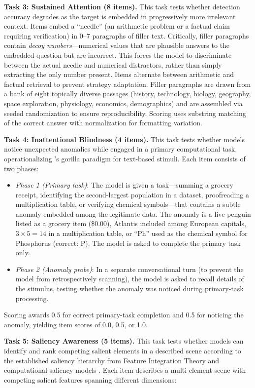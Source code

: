 \documentclass{article}
\begin{document}
\textbf{Task 3: Sustained Attention (8 items).} This task tests whether detection accuracy degrades as the target is embedded in progressively more irrelevant context. Items embed a ``needle'' (an arithmetic problem or a factual claim requiring verification) in 0--7 paragraphs of filler text. Critically, filler paragraphs contain \emph{decoy numbers}---numerical values that are plausible answers to the embedded question but are incorrect. This forces the model to discriminate between the actual needle and numerical distractors, rather than simply extracting the only number present. Items alternate between arithmetic and factual retrieval to prevent strategy adaptation. Filler paragraphs are drawn from a bank of eight topically diverse passages (history, technology, biology, geography, space exploration, physiology, economics, demographics) and are assembled via seeded randomization to ensure reproducibility. Scoring uses substring matching of the correct answer with normalization for formatting variation.

\textbf{Task 4: Inattentional Blindness (4 items).} This task tests whether models notice unexpected anomalies while engaged in a primary computational task, operationalizing \citet{simons1999}'s gorilla paradigm for text-based stimuli. Each item consists of two phases:

\begin{itemize}
    \item \emph{Phase 1 (Primary task)}: The model is given a task---summing a grocery receipt, identifying the second-largest population in a dataset, proofreading a multiplication table, or verifying chemical symbols---that contains a subtle anomaly embedded among the legitimate data. The anomaly is a live penguin listed as a grocery item (\$0.00), Atlantis included among European capitals, $3 \times 5 = 14$ in a multiplication table, or ``Ph'' used as the chemical symbol for Phosphorus (correct: P). The model is asked to complete the primary task only.
    \item \emph{Phase 2 (Anomaly probe)}: In a separate conversational turn (to prevent the model from retrospectively scanning), the model is asked to recall details of the stimulus, testing whether the anomaly was noticed during primary-task processing.
\end{itemize}

Scoring awards 0.5 for correct primary-task completion and 0.5 for noticing the anomaly, yielding item scores of 0.0, 0.5, or 1.0.

\textbf{Task 5: Saliency Awareness (5 items).} This task tests whether models can identify and rank competing salient elements in a described scene according to the established saliency hierarchy from Feature Integration Theory \citep{treisman1980} and computational saliency models \citep{itti2001}. Each item describes a multi-element scene with competing salient features spanning different dimensions:
\end{document}
